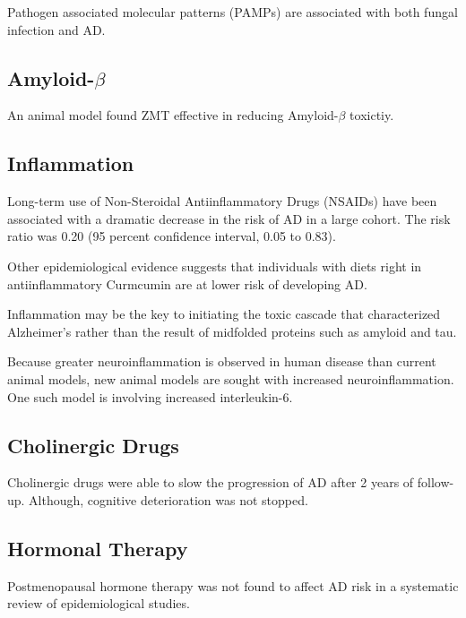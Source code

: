 \documentclass[twocolumn]{article}
\begin{document}
Pathogen associated molecular patterns (PAMPs) are
associated with both fungal infection
\cite{kumar2011pathogen}
and AD.
\cite{salminen2009inflammation}






\subsection{Amyloid-$\beta$}


An animal model found ZMT effective in reducing Amyloid-$\beta$
toxictiy.
\cite{tohda2003repair}


\subsection{Inflammation}


Long-term use of Non-Steroidal Antiinflammatory Drugs (NSAIDs)
have been associated with a dramatic decrease in the risk of AD
in a large cohort.
The risk ratio was 0.20 (95 percent confidence interval, 0.05 to 0.83).
\cite{in2001nonsteroidal}

Other epidemiological evidence suggests that individuals
with diets right in antiinflammatory Curmcumin
are at lower risk of developing AD.
\cite{?}


Inflammation may be the key to initiating the toxic cascade that
characterized Alzheimer's rather than the result of
midfolded proteins such as amyloid and tau.
\cite{heneka2007inflammatory}


Because greater neuroinflammation is observed in human disease
than current animal models,
new animal models are sought with increased neuroinflammation.
One such model is involving increased interleukin-6.
\cite{millington2014chronic}




\subsection{Cholinergic Drugs}

Cholinergic drugs were able to slow the progression of AD
after 2 years of follow-up.
Although, cognitive deterioration was not stopped.
\cite{requena2006effects}




\subsection{Hormonal Therapy}
Postmenopausal hormone therapy was not found
to affect AD risk in a systematic review of
epidemiological studies.
\cite{o2014postmenopausal}
\end{document}
